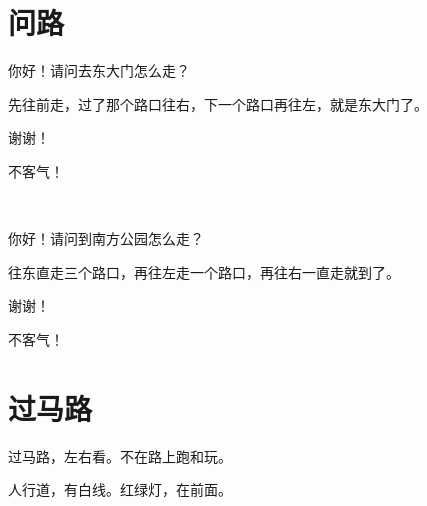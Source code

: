 \documentclass[12pt,UTF-8,openany]{ctexbook}
\begin{document}
\chapter{问路}

\begin{large}
    
    \begin{description}[itemsep=1ex,leftmargin=2.5em,labelwidth=2em]
    
    \item[{\color{script-1-1} 路人}]你好！请问去东大门怎么走？
    
    \item[{\color{script-1-0} 我}]先往前走，过了那个路口往右，下一个路口再往左，就是东大门了。
    
    \item[{\color{script-1-1} 路人}]谢谢！
    
    \item[{\color{script-1-0} 我}]不客气！
    
    \noindent ~
    
    \item[{\color{script-1-1} 路人}]你好！请问到南方公园怎么走？
    
    \item[{\color{script-1-0} 我}]往东直走三个路口，再往左走一个路口，再往右一直走就到了。
    
    \item[{\color{script-1-1} 路人}]谢谢！
    
    \item[{\color{script-1-0} 我}]不客气！
    
    \end{description}
    
    
\end{large}





\chapter{过马路}

\begin{large}
    
    过马路，左右看。不在路上跑和玩。
    
    人行道，有白线。红绿灯，在前面。
    
\end{large}
\end{document}
